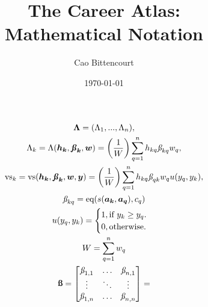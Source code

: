 \documentclass{article}
\title{
    The Career Atlas:\\
    Mathematical Notation
}
\author{Cao Bittencourt}
\date{\today}
\begin{document}
\maketitle

\begin{gather}
    \boldsymbol{\Lambda} = (\Lambda_{1}, ..., \Lambda_{n}),\\
    \Lambda_k = 
    \Lambda(\boldsymbol{h_{k}}, \boldsymbol{\textbf{\textit{\ss}}_{k}}, \boldsymbol{w}) = 
        \left(
            \frac{1}{W}
        \right)
        \sum_{q=1}^{n}{
            h_{kq}
            \textit{\ss}_{kq}
            w_q
        },\\
    \text{vs}_k = 
    \text{vs}(\boldsymbol{h_{k}}, \boldsymbol{\textbf{\textit{\ss}}_{k}}, \boldsymbol{w}, \boldsymbol{y}) = 
    \left(
        \frac{1}{W}
    \right)
        \sum_{q=1}^{n}{
            h_{kq}
            \textit{\ss}_{qk}
            w_q
            u(y_q,y_k)
        }
        ,\\
    \textit{\ss}_{kq} = 
        \text{eq}(s(\boldsymbol{a_k},\boldsymbol{a_q}), c_q)\\
    u(y_q,y_k) =
    \begin{cases}
        1, \text{if } y_k \geq y_q.\\
        0, \text{otherwise.}
    \end{cases}\\
    W = 
        \sum_{q=1}^{n}{
            w_q
        }\\
    \textbf{\ss} = 
    \begin{bmatrix}
        \textit{\ss}_{1,1} & \hdots & \textit{\ss}_{n,1}\\
        \vdots & \ddots & \vdots\\
        \textit{\ss}_{1,n} & \hdots & \textit{\ss}_{n,n}\\
    \end{bmatrix} = 

\end{gather}
\end{document}

